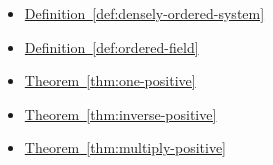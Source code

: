 \begin{dependencies}
\begin{itemize}
  \item \hyperref[def:densely-ordered-system]{Definition~\ref*{def:densely-ordered-system}}
  \item \hyperref[def:ordered-field]{Definition~\ref*{def:ordered-field}}
  \item \hyperref[thm:one-positive]{Theorem~\ref*{thm:one-positive}}
  \item \hyperref[thm:inverse-positive]{Theorem~\ref*{thm:inverse-positive}}
  \item \hyperref[thm:multiply-positive]{Theorem~\ref*{thm:multiply-positive}}
\end{itemize}
\end{dependencies}
